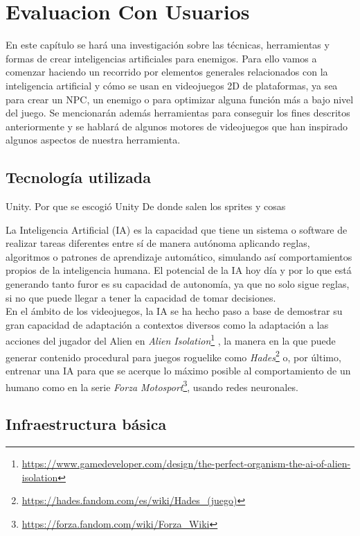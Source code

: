 \setcounter{secnumdepth}{3} %
\chapter{Evaluacion Con Usuarios}
\label{cap:evaluacionConUsuarios}
En este capítulo se hará una investigación sobre las técnicas, herramientas y formas de crear inteligencias artificiales para enemigos.
Para ello vamos a comenzar haciendo un recorrido por elementos generales relacionados con la inteligencia artificial y cómo se usan en videojuegos 2D de plataformas, ya sea para crear un NPC, un enemigo o para optimizar alguna función más a bajo nivel del juego.
Se mencionarán además herramientas para conseguir los fines descritos anteriormente y se hablará de algunos motores de videojuegos que han inspirado algunos aspectos de nuestra herramienta. \\


\section{Tecnología utilizada}
Unity.
	Por que se escogió Unity
De donde salen los sprites y cosas

La Inteligencia Artificial (IA) es la capacidad que tiene un sistema o software de realizar tareas diferentes entre sí de manera autónoma aplicando reglas, algoritmos o patrones de aprendizaje automático, simulando así comportamientos propios de la inteligencia humana.
El potencial de la IA hoy día y por lo que está generando tanto furor es su capacidad de autonomía, ya que no solo sigue reglas, si no que puede llegar a tener la capacidad de tomar decisiones.\\
En el ámbito de los videojuegos, la IA se ha hecho paso a base de demostrar su gran capacidad de adaptación a contextos diversos como la adaptación a las acciones del jugador del Alien en \textit{Alien Isolation}\footnote{\url{https://www.gamedeveloper.com/design/the-perfect-organism-the-ai-of-alien-isolation}} , la manera en la que puede generar contenido procedural para juegos roguelike como \textit{Hades}\footnote{\url{https://hades.fandom.com/es/wiki/Hades_(juego)}} o, por último, entrenar una IA para que se acerque lo máximo posible al comportamiento de un humano como en la serie \textit{Forza Motosport}\footnote{\url{https://forza.fandom.com/wiki/Forza_Wiki}}, usando redes neuronales.\\


\section{Infraestructura básica}

